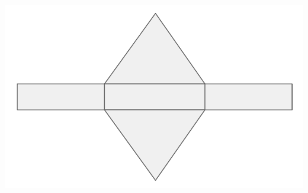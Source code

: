 \documentclass[a4paper,11pt]{report}
\begin{document}
\begin{exop}
{\begin{tasks}
	\includegraphics[scale=0.4]{media/es-20/pt815721}
		\task
		

\end{tasks}}
\end{exop}
\end{document}
